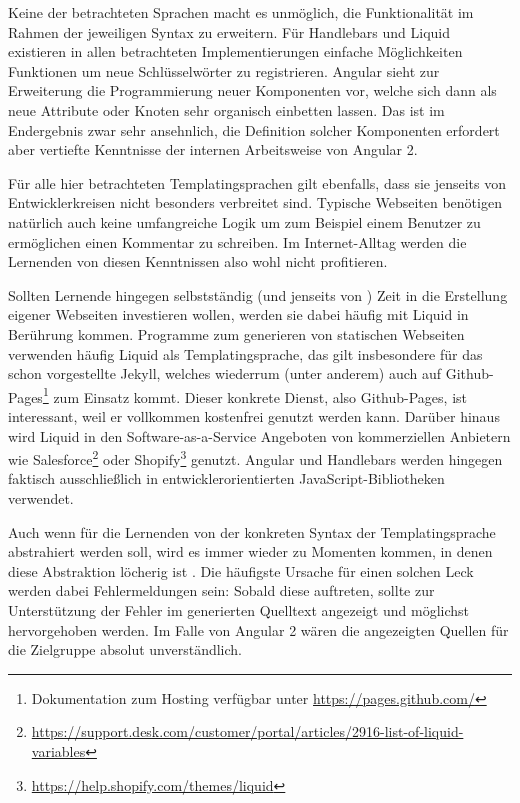Keine der betrachteten Sprachen macht es unmöglich, die Funktionalität im Rahmen der jeweiligen Syntax zu erweitern. Für Handlebars und Liquid existieren in allen betrachteten Implementierungen einfache Möglichkeiten Funktionen um neue Schlüsselwörter zu registrieren. Angular sieht zur Erweiterung die Programmierung neuer Komponenten vor, welche sich dann als neue Attribute oder Knoten sehr organisch einbetten lassen. Das ist im Endergebnis zwar sehr ansehnlich, die Definition solcher Komponenten erfordert aber vertiefte Kenntnisse der internen Arbeitsweise von Angular 2.

Für alle hier betrachteten Templatingsprachen gilt ebenfalls, dass sie jenseits von Entwicklerkreisen nicht besonders verbreitet sind. Typische Webseiten benötigen natürlich auch keine umfangreiche Logik um zum Beispiel einem Benutzer zu ermöglichen einen Kommentar zu schreiben. Im Internet-Alltag werden die Lernenden von diesen Kenntnissen also wohl nicht profitieren.

Sollten Lernende hingegen selbstständig (und jenseits von \idename{}) Zeit in die Erstellung eigener Webseiten investieren wollen, werden sie dabei häufig mit Liquid in Berührung kommen. Programme zum generieren von statischen Webseiten verwenden häufig Liquid als Templatingsprache, das gilt insbesondere für das schon vorgestellte Jekyll, welches wiederrum (unter anderem) auch auf Github-Pages\footnote{Dokumentation zum Hosting verfügbar unter \url{https://pages.github.com/}} zum Einsatz kommt. Dieser konkrete Dienst, also Github-Pages, ist interessant, weil er vollkommen kostenfrei genutzt werden kann. Darüber hinaus wird Liquid in den Software-as-a-Service Angeboten von kommerziellen Anbietern wie Salesforce\footnote{\url{https://support.desk.com/customer/portal/articles/2916-list-of-liquid-variables}} oder Shopify\footnote{\url{https://help.shopify.com/themes/liquid}} genutzt. Angular und Handlebars werden hingegen faktisch ausschließlich in entwicklerorientierten JavaScript-Bibliotheken verwendet.

Auch wenn für die Lernenden von der konkreten Syntax der Templatingsprache abstrahiert werden soll, wird es immer wieder zu Momenten kommen, in denen diese Abstraktion löcherig ist \cite{spolsky_law_abstractions}. Die häufigste Ursache für einen solchen Leck werden dabei Fehlermeldungen sein: Sobald diese auftreten, sollte zur Unterstützung der Fehler im generierten Quelltext angezeigt und möglichst hervorgehoben werden. Im Falle von Angular 2 wären die angezeigten Quellen für die Zielgruppe absolut unverständlich.

